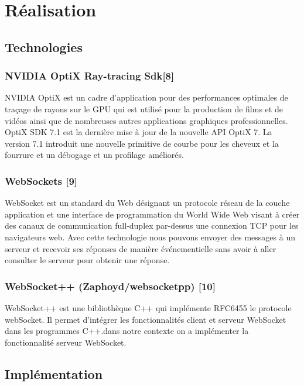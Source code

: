 \section{Réalisation}
\subsection{Technologies}
\subsubsection*{NVIDIA OptiX Ray-tracing Sdk[8]}
NVIDIA OptiX est un cadre d'application pour des performances optimales de traçage de rayons sur le GPU qui est utilisé pour la production de films et de vidéos ainsi que de nombreuses autres applications graphiques professionnelles. OptiX SDK 7.1 est la dernière mise à jour de la nouvelle API OptiX 7. La version 7.1 introduit une nouvelle primitive de courbe pour les cheveux et la fourrure et un débogage et un profilage améliorés.

\subsubsection*{WebSockets [9]}
WebSocket est un standard du Web désignant un protocole réseau de la couche application et une interface de programmation du World Wide Web visant à créer des canaux de communication full-duplex par-dessus une connexion TCP pour les navigateurs web. Avec cette technologie nous pouvons envoyer des messages à un serveur et recevoir ses réponses de manière événementielle sans avoir à aller consulter le serveur pour obtenir une réponse.

\subsubsection*{WebSocket++ (Zaphoyd/websocketpp) [10]}
WebSocket++ est une bibliothèque C++ qui implémente RFC6455 le protocole webSocket. Il permet d'intégrer les fonctionnalités client et serveur WebSocket dans les programmes C++.dans notre contexte on a implémenter la fonctionnalité serveur WebSocket. 

\subsection{Implémentation}
